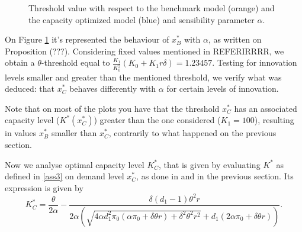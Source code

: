 	\begin{figure}[!htb]
		\begin{subfigmatrix}{2}
		\end{subfigmatrix}
		\caption{Threshold value with respect to the benchmark model (orange) and the capacity optimized model (blue) and sensibility parameter $\alpha$.}
		\label{fig:2_x4}
	\end{figure}
	
	On Figure \ref{fig:2_x4} it's represented the behaviour of $x^*_B$ with $\alpha$, as written on Proposition (???). Considering fixed values mentioned in REFERIRRRR, we obtain a $\theta$-threshold equal to $\frac{K_1}{ K_0^2} (K_0+K_1 r \delta)=1.23457$. Testing for innovation levels smaller and greater than the mentioned threshold, we verify what was deduced: that $x^*_C$ behaves differently with $\alpha$ for certain levels of innovation.
	
	Note that on most of the plots you have that the threshold $x_C^*$ has an associated capacity level ($K^*(x_C^*)$) greater than the one considered ($K_1=100$), resulting in values $x^*_B$ smaller than $x_C^*$, contrarily to what happened on the previous section.
	\vspace{2cm}
	
	Now we analyse optimal capacity level $K^*_C$, that is given by evaluating $K^*$ as defined in \eqref{ass3} on demand level $x^*_C$, as done in \cite{huis:cap} and in the previous section. Its expression is given by
$$K^*_C=\frac{\theta }{2 \alpha }-\frac{\delta  (d_1-1) \theta ^2 r}{2 \alpha  \left(\sqrt{4 \alpha  d_1^2 \pi_0 (\alpha  \pi_0+\delta  \theta  r)+\delta ^2 \theta ^2 r^2}+d_1 (2 \alpha  \pi_0+\delta  \theta  r)\right)}.$$\\


